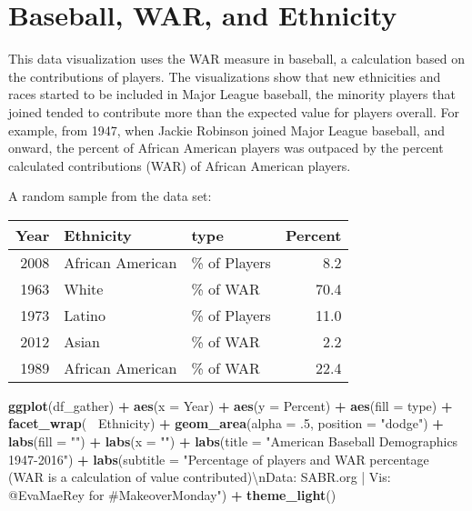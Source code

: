 \documentclass[]{book}
\newenvironment{Shaded}{\begin{snugshade}}{\end{snugshade}}
\newcommand{\KeywordTok}[1]{\textcolor[rgb]{0.13,0.29,0.53}{\textbf{#1}}}
\newcommand{\DataTypeTok}[1]{\textcolor[rgb]{0.13,0.29,0.53}{#1}}
\newcommand{\DecValTok}[1]{\textcolor[rgb]{0.00,0.00,0.81}{#1}}
\newcommand{\CharTok}[1]{\textcolor[rgb]{0.31,0.60,0.02}{#1}}
\newcommand{\StringTok}[1]{\textcolor[rgb]{0.31,0.60,0.02}{#1}}
\newcommand{\OperatorTok}[1]{\textcolor[rgb]{0.81,0.36,0.00}{\textbf{#1}}}
\newcommand{\NormalTok}[1]{#1}
\theoremstyle{definition}
\theoremstyle{definition}
\theoremstyle{definition}
\theoremstyle{remark}
\begin{document}
\chapter{Baseball, WAR, and Ethnicity}\label{baseball-war-and-ethnicity}

This data visualization uses the WAR measure in baseball, a calculation
based on the contributions of players. The visualizations show that new
ethnicities and races started to be included in Major League baseball,
the minority players that joined tended to contribute more than the
expected value for players overall. For example, from 1947, when Jackie
Robinson joined Major League baseball, and onward, the percent of
African American players was outpaced by the percent calculated
contributions (WAR) of African American players.

A random sample from the data set:

\begin{tabular}{r|l|l|r}
\hline
Year & Ethnicity & type & Percent\\
\hline
2008 & African American & \% of Players & 8.2\\
\hline
1963 & White & \% of WAR & 70.4\\
\hline
1973 & Latino & \% of Players & 11.0\\
\hline
2012 & Asian & \% of WAR & 2.2\\
\hline
1989 & African American & \% of WAR & 22.4\\
\hline
\end{tabular}

\begin{Shaded}
\begin{Highlighting}[]
\KeywordTok{ggplot}\NormalTok{(df_gather) }\OperatorTok{+}
\StringTok{  }\KeywordTok{aes}\NormalTok{(}\DataTypeTok{x =}\NormalTok{ Year) }\OperatorTok{+}
\StringTok{  }\KeywordTok{aes}\NormalTok{(}\DataTypeTok{y =}\NormalTok{ Percent) }\OperatorTok{+}
\StringTok{  }\KeywordTok{aes}\NormalTok{(}\DataTypeTok{fill =}\NormalTok{ type) }\OperatorTok{+}
\StringTok{  }\KeywordTok{facet_wrap}\NormalTok{(}\OperatorTok{~}\StringTok{ }\NormalTok{Ethnicity) }\OperatorTok{+}
\StringTok{  }\KeywordTok{geom_area}\NormalTok{(}\DataTypeTok{alpha =}\NormalTok{ .}\DecValTok{5}\NormalTok{, }\DataTypeTok{position =} \StringTok{"dodge"}\NormalTok{) }\OperatorTok{+}
\StringTok{  }\KeywordTok{labs}\NormalTok{(}\DataTypeTok{fill =} \StringTok{""}\NormalTok{) }\OperatorTok{+}
\StringTok{  }\KeywordTok{labs}\NormalTok{(}\DataTypeTok{x =} \StringTok{""}\NormalTok{) }\OperatorTok{+}
\StringTok{  }\KeywordTok{labs}\NormalTok{(}\DataTypeTok{title =} \StringTok{"American Baseball Demographics 1947-2016"}\NormalTok{) }\OperatorTok{+}
\StringTok{  }\KeywordTok{labs}\NormalTok{(}\DataTypeTok{subtitle =} \StringTok{"Percentage of players and WAR percentage (WAR is a calculation of value contributed)}\CharTok{\textbackslash{}n}\StringTok{Data: SABR.org | Vis: @EvaMaeRey for #MakeoverMonday"}\NormalTok{) }\OperatorTok{+}
\StringTok{  }\KeywordTok{theme_light}\NormalTok{() }
\end{Highlighting}
\end{Shaded}
\end{document}
